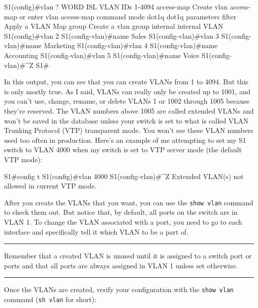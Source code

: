 \begin{cli}
S1(config)#vlan ?
 WORD        ISL VLAN IDs 1-4094
 access-map  Create vlan access-map or enter vlan access-map command mode
 dot1q       dot1q parameters
 filter      Apply a VLAN Map
 group       Create a vlan group
 internal    internal VLAN
S1(config)#vlan 2
S1(config-vlan)#name Sales
S1(config-vlan)#vlan 3
S1(config-vlan)#name Marketing
S1(config-vlan)#vlan 4
S1(config-vlan)#name Accounting
S1(config-vlan)#vlan 5
S1(config-vlan)#name Voice
S1(config-vlan)#^Z
S1#
\end{cli}

In this output, you can see that you can create VLANs from 1 to 4094.
But this is only mostly true.
As I said, VLANs can really only be created up to 1001, and you can't use, change, rename, or delete VLANs 1
or 1002 through 1005 because they're reserved.
The VLAN numbers above 1005 are called extended VLANs and won't be saved in the database unless your switch is set to what is called VLAN Trunking Protocol (VTP)
transparent mode.
You won't see these VLAN numbers used too often in production.
Here's an example of me attempting to set my S1 switch to VLAN 4000 when my switch is set to VTP server mode (the default VTP mode):

\begin{cli}
S1#config t
S1(config)#vlan 4000
S1(config-vlan)#^Z
Extended VLAN(s) not allowed in current VTP mode.
\end{cli}

After you create the VLANs that you want, you can use the
\texttt{show\ vlan} command to check them out. But notice that, by
default, all ports on the switch are in VLAN 1. To change the VLAN
associated with a port, you need to go to each interface and
specifically tell it which VLAN to be a part of.

\begin{center}\rule{0.5\linewidth}{0.5pt}\end{center}

Remember that a created VLAN is unused
until it is assigned to a switch port or ports and that all ports are
always assigned in VLAN 1 unless set otherwise.

\begin{center}\rule{0.5\linewidth}{0.5pt}\end{center}

Once the VLANs are created, verify your configuration with the
\texttt{show\ vlan} command (\texttt{sh\ vlan} for short):

